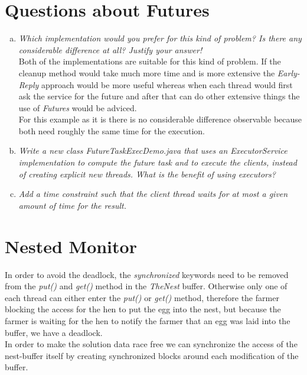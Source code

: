 \documentclass{report}
\begin{document}
	\section{Questions about Futures}
	\startsection
		\begin{enumerate}[a)]
			\item \textit{Which implementation would you prefer for this kind of problem? Is there any considerable difference at all? Justify your answer!} \\
			Both of the implementations are suitable for this kind of problem. If the cleanup method would take much more time and is more extensive the \textit{Early-Reply} approach would be more useful whereas when each thread would first ask the service for the future and after that can do other extensive things the use of \textit{Futures} would be adviced. \\
			For this example as it is there is no considerable difference observable because both need roughly the same time for the execution.
			\item \textit{Write a new class FutureTaskExecDemo.java that uses an ExecutorService implementation to compute the future task and to execute the clients, instead of creating explicit new threads. What is the benefit of using executors?} \\
			\item \textit{Add a time constraint such that the client thread waits for at most a given amount of time for the result.} \\
		\end{enumerate}
	\closesection
	
	\section{Nested Monitor}
	\startsection
		In order to avoid the deadlock, the \textit{synchronized} keywords need to be removed from the \textit{put()} and \textit{get()} method in the \textit{TheNest} buffer. Otherwise only one of each thread can either enter the \textit{put()} or \textit{get()} method, therefore the farmer blocking the access for the hen to put the egg into the nest, but because the farmer is waiting for the hen to notify the farmer that an egg was laid into the buffer, we have a deadlock. \\
		In order to make the solution data race free we can synchronize the access of the nest-buffer itself by creating synchronized blocks around each modification of the buffer.
	\closesection
	
\end{document}
